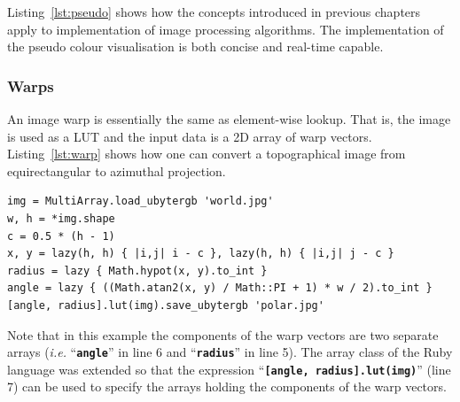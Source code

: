\documentclass[12pt,a4paper,oneside,openright]{book}
\newcommand{\ie}{\emph{i.e.} }
\newcommand{\Ie}{That is, }
\newcommand{\lst}[1]{Listing~\ref{lst:#1}}
\newcommand{\code}[1]{``\texttt{\textbf{\textcolor{codegray}{\small{#1}}}}''}
\begin{document}
\begin{CJK}{UTF8}{}
\lst{pseudo} shows how the concepts introduced in previous chapters apply to implementation of image processing algorithms. The implementation of the pseudo colour visualisation is both concise and real-time capable.

\subsubsection{Warps}\label{cha:warps}
An image warp is essentially the same as element-wise lookup. \Ie the image is used as a \ac{LUT} and the input data is a \ac{2D} array of warp vectors. \lst{warp} shows how one can convert a topographical image from equirectangular to azimuthal projection.
\lstset{language=Ruby,frame=single,numbers=left}
\begin{lstlisting}[float=htbp,caption={Warp from equirectangular to azimuthal projection},escapechar=\$,label=lst:warp]
img = MultiArray.load_ubytergb 'world.jpg'
w, h = *img.shape
c = 0.5 * (h - 1)
x, y = lazy(h, h) { |i,j| i - c }, lazy(h, h) { |i,j| j - c }
radius = lazy { Math.hypot(x, y).to_int }
angle = lazy { ((Math.atan2(x, y) / Math::PI + 1) * w / 2).to_int }
[angle, radius].lut(img).save_ubytergb 'polar.jpg'
\end{lstlisting}
Note that in this example the components of the warp vectors are two separate arrays (\ie \code{angle} in line 6 and \code{radius} in line 5). The array class of the Ruby language was extended so that the expression \code{[angle, radius].lut(img)} (line 7) can be used to specify the arrays holding the components of the warp vectors.


\end{CJK}
\end{document}
